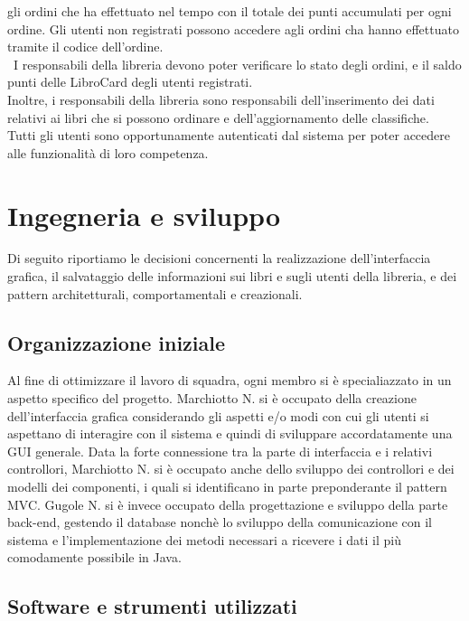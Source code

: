 \documentclass[a4paper,12pt,titlepage]{article}
\begin{document}
gli ordini che ha effettuato nel tempo con il totale dei punti accumulati per ogni ordine.
Gli utenti non registrati possono accedere agli ordini cha hanno effettuato tramite il codice
dell’ordine.\\\
I responsabili della libreria devono poter verificare lo stato degli ordini, e il saldo punti delle
LibroCard degli utenti registrati.\\
Inoltre, i responsabili della libreria sono responsabili dell’inserimento dei dati relativi ai libri che si
possono ordinare e dell’aggiornamento delle classifiche.\\
Tutti gli utenti sono opportunamente autenticati dal sistema per poter accedere alle funzionalità
di loro competenza.

\cleardoublepage

\section{Ingegneria e sviluppo}\label{sec:ingegneria e sviluppo}
Di seguito riportiamo le decisioni concernenti la realizzazione dell’interfaccia grafica, il salvataggio
delle informazioni sui libri e sugli utenti della libreria, e dei pattern architetturali, comportamentali
e creazionali.

\subsection{Organizzazione iniziale}
Al fine di ottimizzare il lavoro di squadra, ogni membro si è specialiazzato in un aspetto specifico del progetto. Marchiotto N. si è occupato della creazione dell'interfaccia grafica considerando gli aspetti e/o modi con cui gli utenti si
aspettano di interagire con il sistema e quindi di sviluppare accordatamente una GUI generale. Data la forte connessione tra la parte di interfaccia e i relativi controllori, Marchiotto N. si è occupato anche dello sviluppo dei controllori e dei modelli dei componenti, i quali si identificano in parte preponderante il pattern MVC.
Gugole N. si è invece occupato della progettazione e sviluppo della parte back-end, gestendo il database nonchè lo sviluppo della comunicazione con il sistema e l'implementazione dei metodi necessari a ricevere i dati il più comodamente possibile in Java.


\subsection{Software e strumenti utilizzati}
\end{document}

